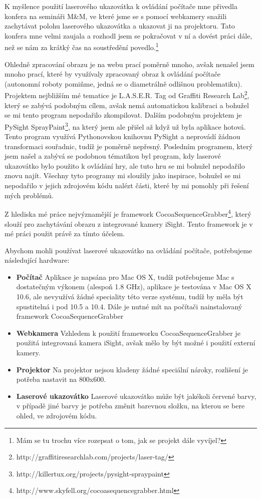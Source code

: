 \documentclass[twoside,12pt]{article}
\begin{document}
K myšlence použití laserového ukazovátka k ovládání počítače mne přivedla konfera na semináři M\&M, ve které jsme se s pomocí webkamery snažili zachytávat polohu laserového ukazovátka a ukazovat ji na projektoru. Tato konfera mne velmi zaujala a rozhodl jsem se pokračovat v ní a dovést práci dále, než se nám za krátký čas na soustředění povedlo.\footnote{Mám se tu trochu více rozepsat o tom, jak se projekt dále vyvíjel?}

Ohledně zpracování obrazu je na webu prací poměrně mnoho, avšak nenašel jsem mnoho prací, které by využívaly zpracovaný obraz k ovládání počítače (autonomní roboty pomiňme, jedná se o diametrálně odlišnou problematiku). Projektem nejbližším mé tematice je L.A.S.E.R. Tag od Graffiti Research Lab\footnote{http://graffitiresearchlab.com/projects/laser-tag/}, který se zabývá podobným cílem, avšak nemá automatickou kalibraci a bohužel se mi tento program nepodařilo zkompilovat. Dalším podobným projektem je PySight SprayPaint\footnote{http://killertux.org/projects/pysight-spraypaint}, na který jsem ale přišel až když už byla aplikace hotová. Tento program využívá Pythonovskou knihovnu PySight a neprovádí žádnou transformaci souřadnic, tudíž je poměrně nepřesný. Posledním programem, který jsem našel a zabývá se podobnou tématikou byl program, kdy laserové ukazovátko bylo použito k ovládání hry, ale tuto hru se mi bohužel nepodařilo znovu najít. Všechny tyto programy mi sloužily jako inspirace, bohužel se mi nepodařilo v jejich zdrojovém kódu nalézt části, které by mi pomohly při řešení mých problémů. 

Z hlediska mé práce nejvýznamější je framework CocoaSequenceGrabber\footnote{http://www.skyfell.org/cocoasequencegrabber.html}, který slouží pro zachytávání obrazu z integrované kamery iSight. Tento framework je v mé práci použit právě za tímto účelem.

Abychom mohli používat laserové ukazovátko na ovládání počítače, potřebujeme následující hardware:
\begin{itemize}
 \item{\bf Počítač} Aplikace je napsána pro Mac OS X, tudíž potřebujeme Mac s dostatečným výkonem (alespoň 1.8 GHz), aplikace je testována v Mac OS X 10.6, ale nevyužívá žádné speciality této verze systému, tudíž by měla být spustitelná i pod 10.5 a 10.4. Dále je nutné mít na počítači nainstalovaný framework CocoaSequenceGrabber
 \item{\bf Webkamera} Vzhledem k použití frameworku CocoaSequenceGrabber je použitá integrovaná kamera iSight, avšak mělo by být možné i použití externí kamery. 
\item{\bf Projektor} Na projektor nejsou kladeny žádné speciální nároky, rozlišení je potřeba nastavit na 800x600.
\item{\bf Laserové ukazovátko} Laserové ukazovátko může být jakékoli červené barvy, v případě jiné barvy je potřeba změnit barevnou složku, na kterou se bere ohled, ve zdrojovém kódu.
\end{itemize}
\end{document}
